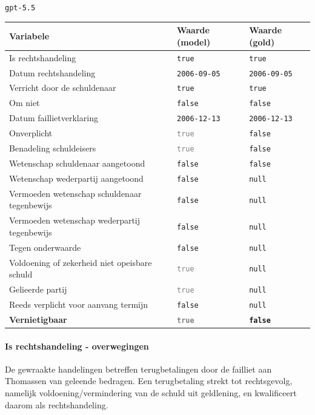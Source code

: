 \documentclass[
  dutch,
  a4paper,
]{article}
\begin{document}
\texttt{gpt-5.5}

\begin{center}
\small
\begin{tabular}{@{}p{7.4cm}p{2.6cm}p{2.6cm}@{}}
\toprule
Variabele & Waarde (model) & Waarde (gold) \\
\midrule
Is rechtshandeling & \texttt{true} & \texttt{true} \\
Datum rechtshandeling & \texttt{2006-09-05} & \texttt{2006-09-05} \\
Verricht door de schuldenaar & \texttt{true} & \texttt{true} \\
Om niet & \texttt{false} & \texttt{false} \\
Datum faillietverklaring & \texttt{2006-12-13} & \texttt{2006-12-13} \\
Onverplicht & \textcolor{gray}{\texttt{true}} & \texttt{false} \\
Benadeling schuldeisers & \textcolor{gray}{\texttt{true}} & \texttt{false} \\
Wetenschap schuldenaar aangetoond & \texttt{false} & \texttt{false} \\
Wetenschap wederpartij aangetoond & \texttt{false} & \texttt{null} \\
Vermoeden wetenschap schuldenaar tegenbewijs & \texttt{false} & \texttt{null} \\
Vermoeden wetenschap wederpartij tegenbewijs & \texttt{false} & \texttt{null} \\
Tegen onderwaarde & \texttt{false} & \texttt{null} \\
Voldoening of zekerheid niet opeisbare schuld & \textcolor{gray}{\texttt{true}} & \texttt{null} \\
Gelieerde partij & \textcolor{gray}{\texttt{true}} & \texttt{null} \\
Reeds verplicht voor aanvang termijn & \texttt{false} & \texttt{null} \\
\textbf{Vernietigbaar} & \textbf{\textcolor{gray}{\texttt{true}}} & \textbf{\texttt{false}} \\
\bottomrule
\end{tabular}
\end{center}

\paragraph{Is rechtshandeling - overwegingen}\label{is-rechtshandeling---overwegingen-73}

De gewraakte handelingen betreffen terugbetalingen door de failliet aan Thomassen van geleende bedragen. Een terugbetaling strekt tot rechtsgevolg, namelijk voldoening/vermindering van de schuld uit geldlening, en kwalificeert daarom als rechtshandeling.
\end{document}
